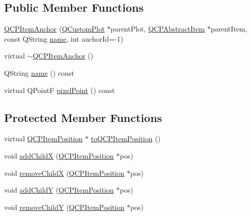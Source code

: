 \subsection*{Public Member Functions}
\begin{DoxyCompactItemize}
\item 
\hyperlink{classQCPItemAnchor_aeb6b681d2bf324db40a915d32ec5624f}{Q\+C\+P\+Item\+Anchor} (\hyperlink{classQCustomPlot}{Q\+Custom\+Plot} $\ast$parent\+Plot, \hyperlink{classQCPAbstractItem}{Q\+C\+P\+Abstract\+Item} $\ast$parent\+Item, const Q\+String \hyperlink{classQCPItemAnchor_ac93984042a58c875e76847dc3e5f75fe}{name}, int anchor\+Id=-\/1)
\item 
virtual \hyperlink{classQCPItemAnchor_a1868559407600688ee4d1a4621e81ceb}{$\sim$\+Q\+C\+P\+Item\+Anchor} ()
\item 
Q\+String \hyperlink{classQCPItemAnchor_ac93984042a58c875e76847dc3e5f75fe}{name} () const 
\item 
virtual Q\+PointF \hyperlink{classQCPItemAnchor_ae92def8f9297c5d73f5806c586517bb3}{pixel\+Point} () const 
\end{DoxyCompactItemize}
\subsection*{Protected Member Functions}
\begin{DoxyCompactItemize}
\item 
virtual \hyperlink{classQCPItemPosition}{Q\+C\+P\+Item\+Position} $\ast$ \hyperlink{classQCPItemAnchor_ac54b20120669950255a63587193dbb86}{to\+Q\+C\+P\+Item\+Position} ()
\item 
void \hyperlink{classQCPItemAnchor_aef15daa640debfb11b0aeaa2116c6fbc}{add\+ChildX} (\hyperlink{classQCPItemPosition}{Q\+C\+P\+Item\+Position} $\ast$pos)
\item 
void \hyperlink{classQCPItemAnchor_a230b1d494cda63458e289bbe1b642599}{remove\+ChildX} (\hyperlink{classQCPItemPosition}{Q\+C\+P\+Item\+Position} $\ast$pos)
\item 
void \hyperlink{classQCPItemAnchor_af05dc56f24536f0c7a9a0f57b58cea67}{add\+ChildY} (\hyperlink{classQCPItemPosition}{Q\+C\+P\+Item\+Position} $\ast$pos)
\item 
void \hyperlink{classQCPItemAnchor_aa2394911d8fff3bd958b9f4f1994b64d}{remove\+ChildY} (\hyperlink{classQCPItemPosition}{Q\+C\+P\+Item\+Position} $\ast$pos)
\end{DoxyCompactItemize}
